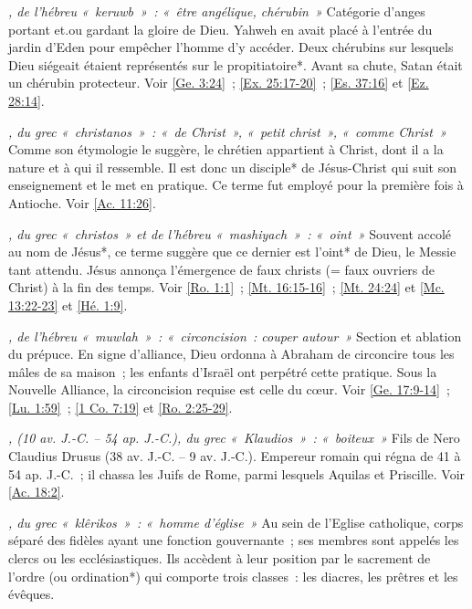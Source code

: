 \begin{multicols}{2}
\textit{, de l'hébreu «~keruwb~»~: «~être angélique, chérubin~»}\newline
Catégorie d'anges portant et.ou gardant la gloire de Dieu. Yahweh en avait placé à l'entrée du jardin d'Eden pour empêcher l'homme d'y accéder. Deux chérubins sur lesquels Dieu siégeait étaient représentés sur le propitiatoire*. Avant sa chute, Satan était un chérubin protecteur. Voir \vref{Ge. 3:24}~; \vref{Ex. 25:17-20}~; \vref{Es. 37:16} et \vref{Ez. 28:14}.

\textit{, du grec «~christanos~»~: «~de Christ~», «~petit christ~», «~comme Christ~»}\newline
Comme son étymologie le suggère, le chrétien appartient à Christ, dont il a la nature et à qui il ressemble. Il est donc un disciple* de Jésus-Christ qui suit son enseignement et le met en pratique. Ce terme fut employé pour la première fois à Antioche. Voir \vref{Ac. 11:26}.

\textit{, du grec «~christos~» et de l'hébreu «~mashiyach~»~: «~oint~»}\newline
Souvent accolé au nom de Jésus*, ce terme suggère que ce dernier est l'oint* de Dieu, le Messie tant attendu. Jésus annonça l'émergence de faux christs (= faux ouvriers de Christ) à la fin des temps. Voir \vref{Ro. 1:1}~; \vref{Mt. 16:15-16}~; \vref{Mt. 24:24} et \vref{Mc. 13:22-23} et \vref{Hé. 1:9}.

\textit{, de l'hébreu «~muwlah~»~: «~circoncision~: couper autour~»}\newline
Section et ablation du prépuce. En signe d'alliance, Dieu ordonna à Abraham de circoncire tous les mâles de sa maison~; les enfants d'Israël ont perpétré cette pratique. Sous la Nouvelle Alliance, la circoncision requise est celle du cœur. Voir \vref{Ge. 17:9-14}~; \vref{Lu. 1:59}~; \vref{1 Co. 7:19} et \vref{Ro. 2:25-29}.

\textit{, (10 av. J.-C. – 54 ap. J.-C.), du grec «~Klaudios~»~: «~boiteux~»}\newline
Fils de Nero Claudius Drusus (38 av. J.-C. – 9 av. J.-C.). Empereur romain qui régna de 41 à 54 ap. J.-C.~; il chassa les Juifs de Rome, parmi lesquels Aquilas et Priscille. Voir \vref{Ac. 18:2}.

\textit{, du grec «~klêrikos~»~: «~homme d'église~»}\newline
Au sein de l'Eglise catholique, corps séparé des fidèles ayant une fonction gouvernante~; ses membres sont appelés les clercs ou les ecclésiastiques. Ils accèdent à leur position par le sacrement de l'ordre (ou ordination*) qui comporte trois classes~: les diacres, les prêtres et les évêques.


\end{multicols}
